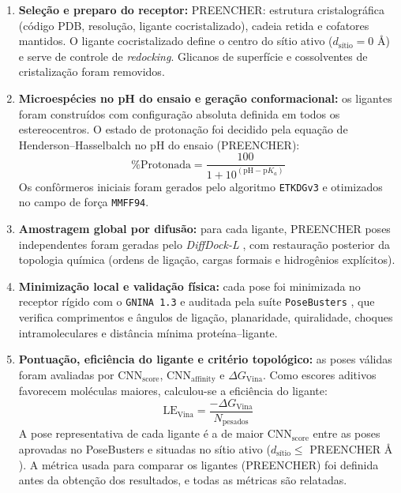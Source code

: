 \begin{enumerate}
    \item \textbf{Seleção e preparo do receptor:} PREENCHER: estrutura cristalográfica (código PDB, resolução, ligante cocristalizado), cadeia retida e cofatores mantidos. O ligante cocristalizado define o centro do sítio ativo ($d_{\text{sítio}} = 0\text{ \AA}$) e serve de controle de \textit{redocking}. Glicanos de superfície e cossolventes de cristalização foram removidos.

    \item \textbf{Microespécies no pH do ensaio e geração conformacional:} os ligantes foram construídos com configuração absoluta definida em todos os estereocentros. O estado de protonação foi decidido pela equação de Henderson--Hasselbalch no pH do ensaio (PREENCHER):
    \begin{equation}
        \%\text{Protonada} = \frac{100}{1 + 10^{(\text{pH} - \text{p}K_a)}}
    \end{equation}
    Os confôrmeros iniciais foram gerados pelo algoritmo \texttt{ETKDGv3} \cite{Riniker2015ETKDG} e otimizados no campo de força \texttt{MMFF94}.

    \item \textbf{Amostragem global por difusão:} para cada ligante, PREENCHER poses independentes foram geradas pelo \textit{DiffDock-L} \cite{Corso2023DiffDock, Corso2024DiffDockL}, com restauração posterior da topologia química (ordens de ligação, cargas formais e hidrogênios explícitos).

    \item \textbf{Minimização local e validação física:} cada pose foi minimizada no receptor rígido com o \texttt{GNINA 1.3} \cite{McNutt2021GNINA10, McNutt2025GNINA13} e auditada pela suíte \texttt{PoseBusters} \cite{Buttenschoen2024PoseBusters}, que verifica comprimentos e ângulos de ligação, planaridade, quiralidade, choques intramoleculares e distância mínima proteína--ligante.

    \item \textbf{Pontuação, eficiência do ligante e critério topológico:} as poses válidas foram avaliadas por $\text{CNN}_{\text{score}}$, $\text{CNN}_{\text{affinity}}$ e $\Delta G_{\text{Vina}}$. Como escores aditivos favorecem moléculas maiores, calculou-se a eficiência do ligante:
    \begin{equation}
        \text{LE}_{\text{Vina}} = \frac{-\Delta G_{\text{Vina}}}{N_{\text{pesados}}}
        \label{eq:le_vina}
    \end{equation}
    A pose representativa de cada ligante é a de maior $\text{CNN}_{\text{score}}$ entre as poses aprovadas no PoseBusters e situadas no sítio ativo ($d_{\text{sítio}} \le$ PREENCHER $\text{\AA}$). A métrica usada para comparar os ligantes (PREENCHER) foi definida antes da obtenção dos resultados, e todas as métricas são relatadas.


\end{enumerate}

